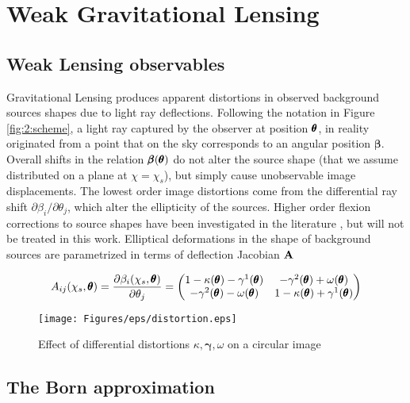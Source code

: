 \section{Weak Gravitational Lensing}

\subsection{Weak Lensing observables}
Gravitational Lensing produces apparent distortions in observed background sources shapes due to light ray deflections. Following the notation in Figure \ref{fig:2:scheme}, a light ray captured by the observer at position $\pmb{\theta}$, in reality originated from a point that on the sky corresponds to an angular position $\pmb{\beta}$. Overall shifts in the relation $\pmb{\beta}(\pmb{\theta})$ do not alter the source shape (that we assume distributed on a plane at $\chi=\chi_s$), but simply cause unobservable image displacements. The lowest order image distortions come from the differential ray shift $\partial \beta_i/\partial \theta_j$, which alter the ellipticity of the sources. Higher order flexion corrections to source shapes have been investigated in the literature \citep{BornFlexion}, but will not be treated in this work. Elliptical deformations in the shape of background sources are parametrized in terms of deflection Jacobian $\mathbf{A}$

\begin{equation}
\label{eq:2:dfl-jacobian}
A_{ij}(\chi_s,\pmb{\theta}) = \frac{\partial \beta_i(\chi_s,\pmb{\theta})}{\partial \theta_j} = 
\begin{pmatrix}
1-\kappa(\pmb{\theta})-\gamma^1(\pmb{\theta}) & -\gamma^2(\pmb{\theta})+\omega(\pmb{\theta}) \\
-\gamma^2(\pmb{\theta})-\omega(\pmb{\theta}) & 1-\kappa(\pmb{\theta})+\gamma^1(\pmb{\theta})
\end{pmatrix}
\end{equation}  

\begin{figure}
\begin{center}
\texttt{[image: Figures/eps/distortion.eps]}
\end{center}
\caption{Effect of differential distortions $\kappa,\pmb{\gamma},\omega$ on a circular image}
\label{fig:2:distortion}
\end{figure}

\subsection{The Born approximation}   

